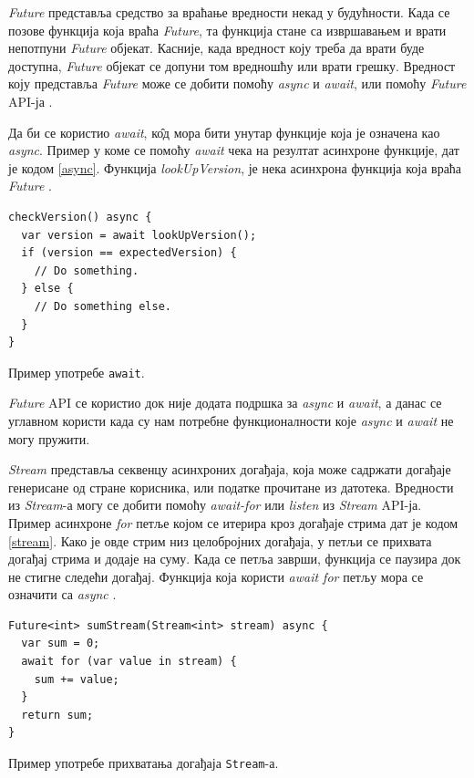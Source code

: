 \documentclass[12pt,oneside]{memoir}
\begin{document}
\textit{Future} представља средство за враћање вредности некад у будућности. Када се позове функција која враћа \textit{Future}, та функција стане са извршавањем и врати непотпуни \textit{Future} објекат. Касније, када вредност коју треба да врати буде доступна, \textit{Future} објекат се допуни том вредношћу или врати грешку. Вредност коју представља \textit{Future} може се добити помоћу \textit{async} и \textit{await}, или помоћу \textit{Future} API-ја \cite{dart, dart1}. 

Да би се користио \textit{await}, к\^{о}д мора бити унутар функције која је означена као \textit{async}. Пример у коме се помоћу \textit{await} чека на резултат асинхроне функције, дат је кодом \ref{async}. Функција \textit{lookUpVersion}, је нека асинхрона функција која враћа \textit{Future} \cite{dart, dart1}.

\begin{listing}
\begin{verbatim}
checkVersion() async {
  var version = await lookUpVersion();
  if (version == expectedVersion) {
    // Do something.
  } else {
    // Do something else.
  }
}
\end{verbatim}
\caption{Пример употребе \texttt{await}.}
\label{async}
\end{listing}

\textit{Future} API се користио док није додата подршка за \textit{async} и \textit{await}, а данас се углавном користи када су нам потребне функционалности које \textit{async} и \textit{await} не могу пружити.

\textit{Stream} представља секвенцу асинхроних догађаја, која може садржати догађаје генерисане од стране корисника, или податке прочитане из датотека.  Вредности из \textit{Stream}-а могу се добити помоћу \textit{await-for} или \textit{listen} из \textit{Stream} API-ја. Пример асинхроне \textit{for} петље којом се итерира кроз догађаје стрима дат је кодом \ref{stream}. Како је овде стрим низ целобројних догађаја, у петљи се прихвата догађај стрима и додаје на суму. Када се петља заврши, функција се паузира док не стигне следећи догађај. Функција која користи \textit{await for} петљу мора се означити са \textit{async} \cite{dart, dart1}.

\begin{listing}
\begin{verbatim}
Future<int> sumStream(Stream<int> stream) async {
  var sum = 0;
  await for (var value in stream) {
    sum += value;
  }
  return sum;
}
\end{verbatim}
\caption{Пример употребе прихватања догађаја \texttt{Stream}-а.}
\label{stream}
\end{listing}
\end{document}
